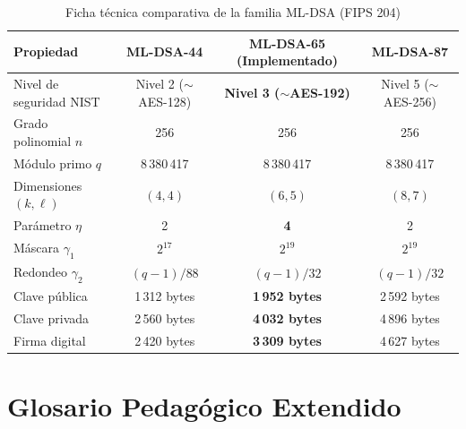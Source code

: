 \documentclass[11pt,a4paper,twoside,openright]{book}
\theoremstyle{plain}
\theoremstyle{definition}
\theoremstyle{remark}
\begin{document}
\begin{table}[H]
\centering
\caption{Ficha t\'ecnica comparativa de la familia ML-DSA (FIPS 204)}
\label{tab:ficha_mldsa}
\begin{tabular}{lccc}
\toprule
\textbf{Propiedad} & \textbf{ML-DSA-44} & \textbf{ML-DSA-65 (Implementado)} & \textbf{ML-DSA-87} \\
\midrule
Nivel de seguridad NIST & Nivel 2 ($\sim$AES-128) & \textbf{Nivel 3 ($\sim$AES-192)} & Nivel 5 ($\sim$AES-256) \\
Grado polinomial $n$ & 256 & 256 & 256 \\
M\'odulo primo $q$ & 8\,380\,417 & 8\,380\,417 & 8\,380\,417 \\
Dimensiones $(k, \ell)$ & $(4, 4)$ & \textbf{$(6, 5)$} & $(8, 7)$ \\
Par\'ametro $\eta$ & 2 & \textbf{4} & 2 \\
M\'ascara $\gamma_1$ & $2^{17}$ & \textbf{$2^{19}$} & $2^{19}$ \\
Redondeo $\gamma_2$ & $(q-1)/88$ & \textbf{$(q-1)/32$} & $(q-1)/32$ \\
Clave p\'ublica & 1\,312 bytes & \textbf{1\,952 bytes} & 2\,592 bytes \\
Clave privada & 2\,560 bytes & \textbf{4\,032 bytes} & 4\,896 bytes \\
Firma digital & 2\,420 bytes & \textbf{3\,309 bytes} & 4\,627 bytes \\
\bottomrule
\end{tabular}
\end{table}

\chapter{Glosario Pedag\'ogico Extendido}
\label{app:glosario_extendido}
\end{document}

